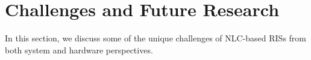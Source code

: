 
\section{Challenges and Future Research}
\label{sc:challenges}
In this section, we discuss some of the unique challenges of \gls{NLC}-based RISs from both system and hardware perspectives.





